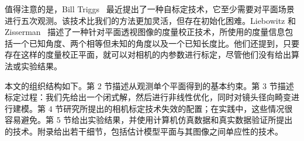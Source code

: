 值得注意的是，Bill Triggs~\cite{triggs1998autocalibration} 最近提出了一种自标定技术，它至少需要对平面场景进行五次观测。该技术比我们的方法更加灵活，但存在初始化困难。Liebowitz 和 Zisserman~\cite{liebowitz1998metric} 描述了一种针对平面透视图像的度量校正技术，所使用的度量信息包括一个已知角度、两个相等但未知的角度以及一个已知长度比。他们还提到，只要存在这样的度量校正平面，就可以对相机的内参数进行标定，尽管他们没有给出算法或实验结果。

本文的组织结构如下。第 2 节描述从观测单个平面得到的基本约束。第 3 节描述标定过程：我们先给出一个闭式解，然后进行非线性优化，同时对镜头径向畸变进行建模。第 4 节研究所提出的相机标定技术失效的配置；在实践中，这些情况很容易避免。第 5 节给出实验结果，并使用计算机仿真数据和真实数据验证所提出的技术。附录给出若干细节，包括估计模型平面与其图像之间单应性的技术。
